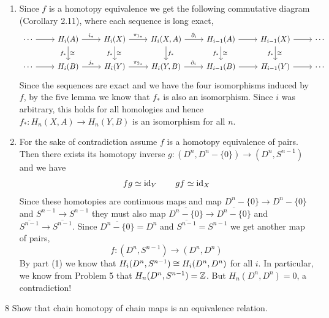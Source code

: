 \documentclass[12pt]{article}
\begin{document}
\begin{solution}
    \bbni
    \begin{enumerate}
        \item Since $f$ is a homotopy equivalence we get the following commutative diagram (Corollary 2.11), where each sequence is long exact, 
        \[\begin{tikzcd} 
            \cdots \ar[r] & H_i(A) \ar[r,"i_*"] \ar[d,"f_*"', "\cong"] & H_i(X) \ar[r,"\pi_{1_*}"] \ar[d,"f_*"', "\cong"] & H_i(X,A) \ar[r,"\partial_i"] \ar[d,"f_*"] & H_{i-1}(A) \ar[r] \ar[d,"f_*"', "\cong"] & H_{i-1}(X) \ar[d,"f_*"', "\cong"] \ar[r] & \cdots \\ 
            \cdots \ar[r] & H_i(B) \ar[r,"j_*"] & H_i(Y) \ar[r,"\pi_{2_*}"] & H_i(Y,B) \ar[r,"\partial_i"] & H_{i-1}(B) \ar[r] & H_{i-1}(Y) \ar[r] & \cdots 
        \end{tikzcd}
        \]
        Since the sequences are exact and we have the four isomorphisms induced by $f$, by the five lemma we know that $f_*$ is also an isomorphism. Since $i$ was arbitrary, this holds for all homologies and hence $ f_* : H_n(X,A) \to H_n(Y,B)$ is an isomorphism for all $n$.
       

        \item For the sake of contradiction assume $f$ is a homotopy equivalence of pairs. Then there exists its homotopy inverse $g: (D^n, D^n - \{0\}) \to (D^n, S^{n-1})$ and we have 
        \[fg \simeq \operatorname{id}_Y \qquad gf \simeq \operatorname{id}_X\]
        Since these homotopies are continuous maps and map $D^n - \{0\} \to D^n - \{0\}$ and $S^{n-1} \to S^{n-1}$ they must also map $\overline{D^n - \{0\}} \to \overline{D^n - \{0\}}$ and $\overline{S^{n-1}} \to \overline{S^{n-1}}$. Since $\overline{D^n - \{0\}} = D^n$ and $\overline{S^{n-1}} = S^{n-1}$ we get another map of pairs, 
        \[f: (D^{n}, S^{n-1}) \to (D^n, D^n)\]
        By part (1) we know that $H_i(D^n, S^{n-1}) \cong H_i(D^n, D^n)$ for all $i$. In particular, we know from Problem 5 that $H_n(D^n, S^{n-1}) = \mathbb Z$. But $H_n(D^n, D^n) = 0$, a contradiction! 
    \end{enumerate}
\end{solution}

\newpage 

\begin{problem}{8}
     Show that chain homotopy of chain maps is an equivalence relation.
\end{problem}
\end{document}
